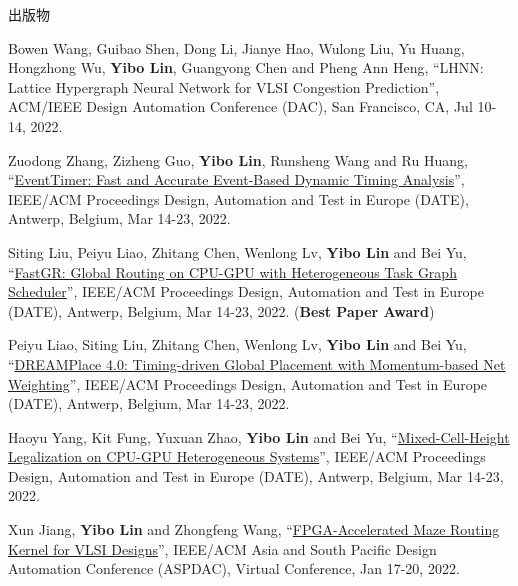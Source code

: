 \begin{rSection}{出版物}
\begin{description}[font=\normalfont, rightmargin=2em]
{}
            

\item[{[C61]}]{
        Bowen Wang, Guibao Shen, Dong Li, Jianye Hao, Wulong Liu, Yu Huang, Hongzhong Wu, \textbf{Yibo Lin}, Guangyong Chen and Pheng Ann Heng, 
    ``LHNN: Lattice Hypergraph Neural Network for VLSI Congestion Prediction'', 
    ACM/IEEE Design Automation Conference (DAC), San Francisco, CA, Jul 10-14, 2022.
    
}
            

\item[{[C60]}]{
        Zuodong Zhang, Zizheng Guo, \textbf{Yibo Lin}, Runsheng Wang and Ru Huang, 
    ``\href{https://doi.org/10.23919/DATE54114.2022.9774642}{EventTimer: Fast and Accurate Event-Based Dynamic Timing Analysis}'', 
    IEEE/ACM Proceedings Design, Automation and Test in Europe (DATE), Antwerp, Belgium, Mar 14-23, 2022.
    
}
            

\item[{[C59]}]{
        Siting Liu, Peiyu Liao, Zhitang Chen, Wenlong Lv, \textbf{Yibo Lin} and Bei Yu, 
    ``\href{https://doi.org/10.23919/DATE54114.2022.9774606}{FastGR: Global Routing on CPU-GPU with Heterogeneous Task Graph Scheduler}'', 
    IEEE/ACM Proceedings Design, Automation and Test in Europe (DATE), Antwerp, Belgium, Mar 14-23, 2022.
    (\textbf{Best Paper Award})
}
            

\item[{[C58]}]{
        Peiyu Liao, Siting Liu, Zhitang Chen, Wenlong Lv, \textbf{Yibo Lin} and Bei Yu, 
    ``\href{https://doi.org/10.23919/DATE54114.2022.9774725}{DREAMPlace 4.0: Timing-driven Global Placement with Momentum-based Net Weighting}'', 
    IEEE/ACM Proceedings Design, Automation and Test in Europe (DATE), Antwerp, Belgium, Mar 14-23, 2022.
    
}
            

\item[{[C57]}]{
        Haoyu Yang, Kit Fung, Yuxuan Zhao, \textbf{Yibo Lin} and Bei Yu, 
    ``\href{https://doi.org/10.23919/DATE54114.2022.9774671}{Mixed-Cell-Height Legalization on CPU-GPU Heterogeneous Systems}'', 
    IEEE/ACM Proceedings Design, Automation and Test in Europe (DATE), Antwerp, Belgium, Mar 14-23, 2022.
    
}
            

\item[{[C56]}]{
        Xun Jiang, \textbf{Yibo Lin} and Zhongfeng Wang, 
    ``\href{https://doi.org/10.1109/ASP-DAC52403.2022.9712533}{FPGA-Accelerated Maze Routing Kernel for VLSI Designs}'', 
    IEEE/ACM Asia and South Pacific Design Automation Conference (ASPDAC), Virtual Conference, Jan 17-20, 2022.
    
}
\end{description}
\end{rSection}
